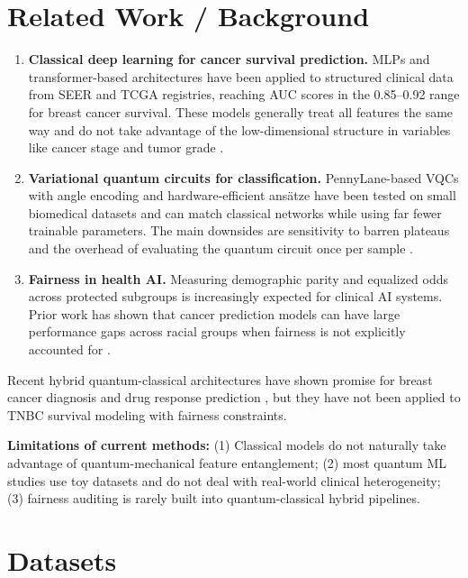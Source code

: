 \documentclass[12pt, letterpaper]{article}
\begin{document}
\section{Related Work / Background}

\begin{enumerate}[label=\arabic*.]
    \item \textbf{Classical deep learning for cancer survival prediction.} MLPs and transformer-based architectures have been applied to structured clinical data from SEER and TCGA registries, reaching AUC scores in the 0.85--0.92 range for breast cancer survival. These models generally treat all features the same way and do not take advantage of the low-dimensional structure in variables like cancer stage and tumor grade \citep{huang2022, qiu2024}.

    \item \textbf{Variational quantum circuits for classification.} PennyLane-based VQCs with angle encoding and hardware-efficient ans\"{a}tze have been tested on small biomedical datasets and can match classical networks while using far fewer trainable parameters. The main downsides are sensitivity to barren plateaus and the overhead of evaluating the quantum circuit once per sample \citep{schuld2021, benedetti2019}.

    \item \textbf{Fairness in health AI.} Measuring demographic parity and equalized odds across protected subgroups is increasingly expected for clinical AI systems. Prior work has shown that cancer prediction models can have large performance gaps across racial groups when fairness is not explicitly accounted for \citep{chen2023, raza2024}.
\end{enumerate}

Recent hybrid quantum-classical architectures have shown promise for breast cancer diagnosis \citep{xiang2024} and drug response prediction \citep{sagingalieva2022}, but they have not been applied to TNBC survival modeling with fairness constraints.

\noindent\textbf{Limitations of current methods:} (1) Classical models do not naturally take advantage of quantum-mechanical feature entanglement; (2) most quantum ML studies use toy datasets and do not deal with real-world clinical heterogeneity; (3) fairness auditing is rarely built into quantum-classical hybrid pipelines.


\section{Datasets}
\end{document}
